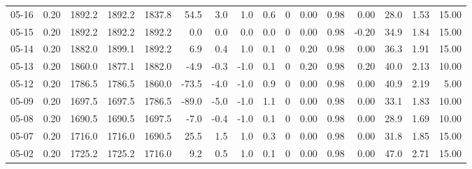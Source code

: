 \begin{threeparttable}
{\begin{tabular}{lrrrrrrrrrrrrrrr}
  05-16 &     0.20 & 1892.2 & 1892.2 & 1837.8 &       54.5 &            3.0 &                      1.0 &                 0.6 &              0 &       0.00 &      0.98 &           0.00 &             28.0 &            1.53 &                  15.00 \\
  05-15 &     0.20 & 1892.2 & 1892.2 & 1892.2 &        0.0 &            0.0 &                      0.0 &                 0.0 &              0 &       0.00 &      0.98 &          -0.20 &             34.9 &            1.84 &                  15.00 \\
  05-14 &     0.20 & 1882.0 & 1899.1 & 1892.2 &        6.9 &            0.4 &                      1.0 &                 0.1 &              0 &       0.20 &      0.98 &           0.00 &             36.3 &            1.91 &                  15.00 \\
  05-13 &     0.20 & 1860.0 & 1877.1 & 1882.0 &       -4.9 &           -0.3 &                     -1.0 &                 0.1 &              0 &       0.20 &      0.98 &           0.20 &             40.0 &            2.13 &                  10.00 \\
  05-12 &     0.20 & 1786.5 & 1786.5 & 1860.0 &      -73.5 &           -4.0 &                     -1.0 &                 0.9 &              0 &       0.00 &      0.98 &           0.00 &             40.9 &            2.19 &                   5.00 \\
  05-09 &     0.20 & 1697.5 & 1697.5 & 1786.5 &      -89.0 &           -5.0 &                     -1.0 &                 1.1 &              0 &       0.00 &      0.98 &           0.00 &             33.1 &            1.83 &                  10.00 \\
  05-08 &     0.20 & 1690.5 & 1690.5 & 1697.5 &       -7.0 &           -0.4 &                     -1.0 &                 0.1 &              0 &       0.00 &      0.98 &           0.00 &             28.9 &            1.69 &                  10.00 \\
  05-07 &     0.20 & 1716.0 & 1716.0 & 1690.5 &       25.5 &            1.5 &                      1.0 &                 0.3 &              0 &       0.00 &      0.98 &           0.00 &             31.8 &            1.85 &                  15.00 \\
  05-02 &     0.20 & 1725.2 & 1725.2 & 1716.0 &        9.2 &            0.5 &                      1.0 &                 0.1 &              0 &       0.00 &      0.98 &           0.00 &             47.0 &            2.71 &                  15.00 \\

\end{tabular}}
\end{threeparttable}

